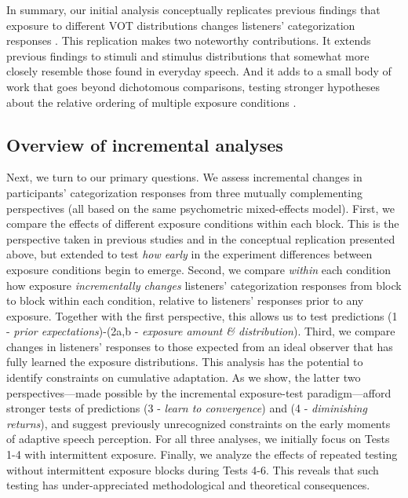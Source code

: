 \documentclass[
  11pt,
  man,mask,floatsintext]{apa6}
\begin{document}
In summary, our initial analysis conceptually replicates previous findings that exposure to different VOT distributions changes listeners' categorization responses \autocites[for /b/-/p/:][]{clayards2008,kleinschmidt2015,kleinschmidt2020}[for /g/-/k/,][]{theodore-monto2019}. This replication makes two noteworthy contributions. It extends previous findings to stimuli and stimulus distributions that somewhat more closely resemble those found in everyday speech. And it adds to a small body of work that goes beyond dichotomous comparisons, testing stronger hypotheses about the relative ordering of multiple exposure conditions \autocites[e.g.,][]{babel2019,bejjanki2011,bradlow-bent2008,cummings-theodore2023,kleinschmidt2020,liu-jaeger2018}.

\subsection{Overview of incremental analyses}\label{overview-of-incremental-analyses}

Next, we turn to our primary questions. We assess incremental changes in participants' categorization responses from three mutually complementing perspectives (all based on the same psychometric mixed-effects model). First, we compare the effects of different exposure conditions within each block. This is the perspective taken in previous studies and in the conceptual replication presented above, but extended to test \emph{how early} in the experiment differences between exposure conditions begin to emerge. Second, we compare \emph{within} each condition how exposure \emph{incrementally changes} listeners' categorization responses from block to block within each condition, relative to listeners' responses prior to any exposure. Together with the first perspective, this allows us to test predictions (1 - \emph{prior expectations})-(2a,b - \emph{exposure amount \& distribution}). Third, we compare changes in listeners' responses to those expected from an ideal observer that has fully learned the exposure distributions. This analysis has the potential to identify constraints on cumulative adaptation. As we show, the latter two perspectives---made possible by the incremental exposure-test paradigm---afford stronger tests of predictions (3 - \emph{learn to convergence}) and (4 - \emph{diminishing returns}), and suggest previously unrecognized constraints on the early moments of adaptive speech perception. For all three analyses, we initially focus on Tests 1-4 with intermittent exposure. Finally, we analyze the effects of repeated testing without intermittent exposure blocks during Tests 4-6. This reveals that such testing has under-appreciated methodological and theoretical consequences.
\end{document}
